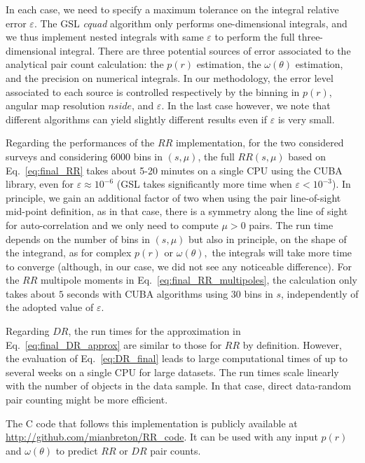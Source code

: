 \documentclass{aa}
\begin{document}
In each case, we need to specify a maximum tolerance on the integral relative error $\varepsilon$. The \textsc{GSL} \emph{cquad} algorithm only performs one-dimensional integrals, and we thus implement nested integrals with same $\varepsilon$ to perform the full three-dimensional integral. There are three potential sources of error associated to the analytical pair count calculation: the $p(r)$ estimation, the $\omega(\theta)$ estimation, and the precision on numerical integrals. In our methodology, the error level associated to each source is controlled respectively by the binning in $p(r)$, angular map resolution $nside$, and $\varepsilon$. In the last case however, we note that different algorithms can yield slightly different results even if $\varepsilon$ is very small.

Regarding the performances of the $RR$ implementation, for the two considered surveys and considering $6000$ bins in $(s,\mu)$, the full $RR(s,\mu)$ based on Eq.~\eqref{eq:final_RR} takes about 5-20 minutes on a single CPU using the \textsc{CUBA} library, even for $\varepsilon \approx 10^{-6}$ (\textsc{GSL} takes significantly more time when $\varepsilon < 10^{-3}$). In principle, we gain an additional factor of two when using the pair line-of-sight  mid-point definition, as in that case, there is a symmetry along the line of sight for auto-correlation and we only need to compute $\mu > 0$ pairs. The run time depends on the number of bins in $(s,\mu)$ but also in principle, on the shape of the integrand, as for complex $p(r)$ or $\omega(\theta),$ the integrals will take more time to converge (although, in our case, we did not see any noticeable difference). For the $RR$ multipole moments in Eq.~\eqref{eq:final_RR_multipoles}, the calculation only takes about $5$ seconds with \textsc{CUBA} algorithms using 30 bins in $s$, independently of the adopted value of $\varepsilon$. 

Regarding $DR$, the run times for the approximation in Eq.~\eqref{eq:final_DR_approx} are similar to those for $RR$ by definition. However, the evaluation of Eq.~\eqref{eq:DR_final} leads to large computational times of up to several weeks on a single CPU for large datasets. The run times scale linearly with the number of objects in the data sample. In that case, direct data-random pair counting might be more efficient.

The C code that follows this implementation is publicly available at \url{http://github.com/mianbreton/RR_code}. It can be used with any input $p(r)$ and $\omega(\theta)$ to predict $RR$ or $DR$ pair counts.
\end{document}
